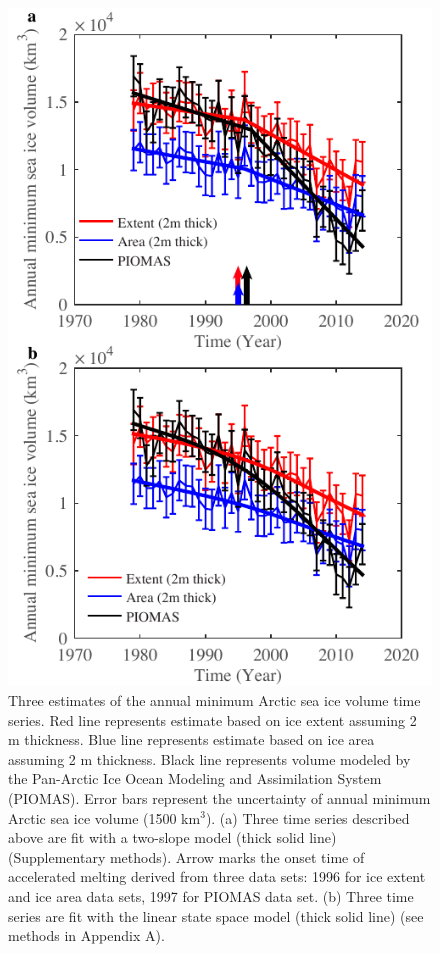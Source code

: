 \begin{figure}
	\centering
	\includegraphics{figs_app/FigS5.pdf}
	\caption[Three estimates of the annual minimum Arctic sea ice volume time series.]{Three estimates of the annual minimum Arctic sea ice volume time series.  Red line represents estimate based on ice extent assuming 2 m thickness.  Blue line represents estimate based on ice area assuming 2 m thickness. Black line represents volume modeled by the Pan-Arctic Ice Ocean Modeling and Assimilation System (PIOMAS)\cite[]{zhang2003modeling}.  Error bars represent the uncertainty of annual minimum Arctic sea ice volume (1500 km$^{3}$).  (a) Three time series described above are fit with a two-slope model (thick solid line) (Supplementary methods).  Arrow marks the onset time of accelerated melting derived from three data sets: 1996 for ice extent and ice area data sets, 1997 for PIOMAS data set. (b) Three time series are fit with the linear state space model (thick solid line) (see methods in Appendix A). }
	\label{fig:SI4_fig5}
\end{figure}

